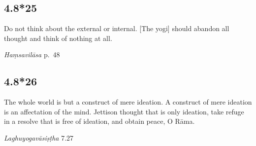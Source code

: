 \begin{ekdosis}
\begin{testimonia}[hp04_008_24]
\end{testimonia}


\subsection*{4.8*25}
\begin{translation}[hp04_008_25]
Do not think about the external or internal. [The yogi] should abandon all thought and think of nothing at all.
\end{translation}


\begin{testimonia}[hp04_008_25]
\emph{Haṃsavilāsa} p.~48
\begin{versinnote}
\end{versinnote}
\end{testimonia}


\subsection*{4.8*26}
\begin{translation}[hp04_008_26]
The whole world is but a construct of mere ideation. A construct of mere ideation is an affectation of the mind. Jettison thought that is only ideation, take refuge in a resolve that is free of ideation, and obtain peace, O Rāma.
\end{translation}

\begin{sources}[hp04_008_26]
\emph{Laghuyogavāsiṣṭha} 7.27
\begin{versinnote}
\end{versinnote}
\end{sources}


\end{ekdosis}
